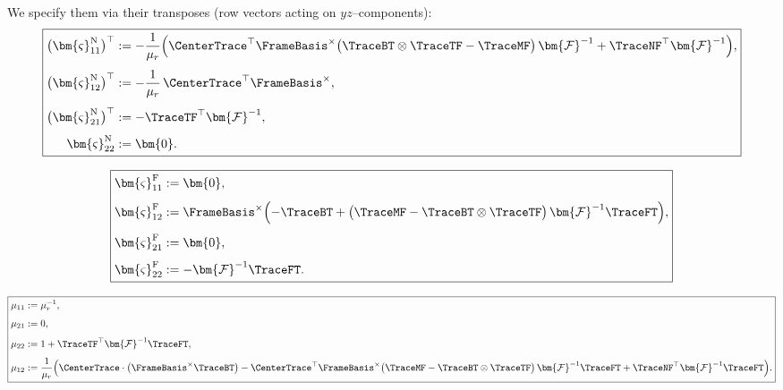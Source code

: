
We specify them via their transposes (row vectors acting on $yz$–components):
\[
\boxed{
\begin{aligned}
\bigl(\bm{\varsigma}_{11}^{\mathrm{N}}\bigr)^\top
&:=
-\frac{1}{\mu_r}
\Bigl(
\CenterTrace^\top\FrameBasis^\times
\bigl(\TraceBT\otimes\TraceTF - \TraceMF\bigr)\,\bm{\mathcal{F}}^{-1}
+
\TraceNF^\top\bm{\mathcal{F}}^{-1}
\Bigr),
\\[4pt]
\bigl(\bm{\varsigma}_{12}^{\mathrm{N}}\bigr)^\top
&:=
-\frac{1}{\mu_r}\,\CenterTrace^\top\FrameBasis^\times,
\\[4pt]
\bigl(\bm{\varsigma}_{21}^{\mathrm{N}}\bigr)^\top
&:=
-\TraceTF^\top\bm{\mathcal{F}}^{-1},
\\[4pt]
\bm{\varsigma}_{22}^{\mathrm{N}}
&:= \bm{0}.
\end{aligned}
}
\]


\[
\boxed{
\begin{aligned}
\bm{\varsigma}_{11}^{\mathrm{F}}
&:= \bm{0},
\\[4pt]
\bm{\varsigma}_{12}^{\mathrm{F}}
&:=
\FrameBasis^\times\Bigl(
-\TraceBT
+
\bigl(\TraceMF - \TraceBT\otimes\TraceTF\bigr)\,\bm{\mathcal{F}}^{-1}\TraceFT
\Bigr),
\\[4pt]
\bm{\varsigma}_{21}^{\mathrm{F}}
&:= \bm{0},
\\[4pt]
\bm{\varsigma}_{22}^{\mathrm{F}}
&:=
-\bm{\mathcal{F}}^{-1}\TraceFT.
\end{aligned}
}
\]


\[
\boxed{
\begin{aligned}
\mu_{11}
&:= \mu_r^{-1},
\\[4pt]
\mu_{21}
&:= 0,
\\[4pt]
\mu_{22}
&:= 1 + \TraceTF^\top\bm{\mathcal{F}}^{-1}\TraceFT,
\\[4pt]
\mu_{12}
&:=
\frac{1}{\mu_r}
\Bigl(
\CenterTrace\cdot\bigl(\FrameBasis^\times\TraceBT\bigr)
-
\CenterTrace^\top\FrameBasis^\times
\bigl(\TraceMF - \TraceBT\otimes\TraceTF\bigr)\,\bm{\mathcal{F}}^{-1}\TraceFT
+
\TraceNF^\top\bm{\mathcal{F}}^{-1}\TraceFT
\Bigr).
\end{aligned}
}
\]


